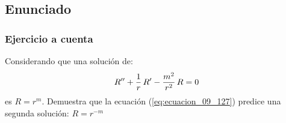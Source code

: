 \documentclass[12pt]{beamer}
\begin{document}
\subsection{Enunciado}

\begin{frame}
\frametitle{Ejercicio a cuenta}
Considerando que una solución de:
\begin{align*}
{R}^{\prime \prime} + \dfrac{1}{r} \, {R}^{\prime} - \dfrac{m^{2}}{r^{2}} \, R = 0
\end{align*}
es $R = r^{m}$. Demuestra que la ecuación (\ref{eq:ecuacion_09_127}) predice una segunda solución: $R = r^{-m}$
\end{frame}
\end{document}
